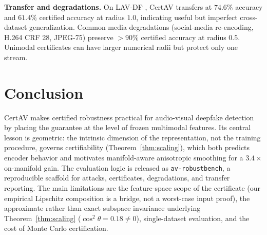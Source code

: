\documentclass{article}
\begin{document}
\noindent\textbf{Transfer and degradations.} On LAV-DF \cite{cai2022lavdf}, CertAV transfers at $74.6\%$ accuracy and $61.4\%$ certified accuracy at radius $1.0$, indicating useful but imperfect cross-dataset generalization. Common media degradations (social-media re-encoding, H.264 CRF 28, JPEG-75) preserve $>90\%$ certified accuracy at radius $0.5$. Unimodal certificates can have larger numerical radii but protect only one stream.

\section{Conclusion}
\label{sec:conclusion}

CertAV makes certified robustness practical for audio-visual deepfake detection by placing the guarantee at the level of frozen multimodal features. Its central lesson is geometric: the intrinsic dimension of the representation, not the training procedure, governs certifiability (Theorem~\ref{thm:scaling}), which both predicts encoder behavior and motivates manifold-aware anisotropic smoothing for a $3.4\times$ on-manifold gain. The evaluation logic is released as \texttt{av-robustbench}, a reproducible scaffold for attacks, certificates, degradations, and transfer reporting. The main limitations are the feature-space scope of the certificate (our empirical Lipschitz composition is a bridge, not a worst-case input proof), the approximate rather than exact subspace invariance underlying Theorem~\ref{thm:scaling} ($\cos^2\theta\!=\!0.18\!\neq\!0$), single-dataset evaluation, and the cost of Monte Carlo certification.



\end{document}
